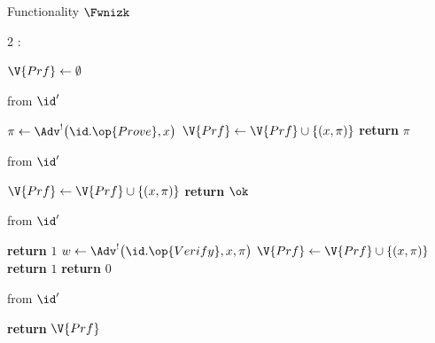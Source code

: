 \begin{interface}[nofloat]{Functionality $\Fwnizk$ \\
}

{\scriptsize
\setlength{\columnsep}{1.4em}
\begin{multicols}{2}
:
\begin{algorithmic}[1]
\setcounter{contline}{0}\algcont
\State $\V{Prf} \gets \emptyset$
\algsave
\end{algorithmic}
\vspace{1.4ex}

 \quad from $\id'$
\begin{algorithmic}[1]
\algcont
{} \label{ln:wnizkrel}
\State $\pi \gets \Adv^{!}\bigl(\id.\op{Prove}, x\bigr)$ \label{ln:wnizkzk}
\State $\V{Prf} \gets \V{Prf} \cup \{(x, \pi)\}$
\State \textbf{return} $\pi$
\algsave
\end{algorithmic}
\vspace{1.4ex}

 \quad from $\id'$
\begin{algorithmic}[1]
\algcont
{} \label{ln:wnizkadv}
 \label{ln:wnizksame}
\State $\V{Prf} \gets \V{Prf} \cup \{(x, \pi)\}$ \label{ln:wnizkmaul}
\State \textbf{return} $\ok$
\algsave
\end{algorithmic}
\vspace{1.4ex}

\columnbreak

 \quad from $\id'$
\begin{algorithmic}[1]
\algcont
{}
\State \textbf{return} $1$ \label{ln:wnizktrans}
\EndIf
\State $w \gets \Adv^{!}\bigl(\id.\op{Verify}, x, \pi\bigr)$
\State $\V{Prf} \gets \V{Prf} \cup \{(x, \pi)\}$ \label{ln:wnizksound}
\State \textbf{return} $1$
\EndIf
\State \textbf{return} $0$
\algsave
\end{algorithmic}
\vspace{1.4ex}

 \quad from $\id'$
\begin{algorithmic}[1]
\algcont
\State \textbf{return} $\V{Prf}$ \label{ln:wnizkleak}
\algsave
\end{algorithmic}
\end{multicols}}
\end{interface}

